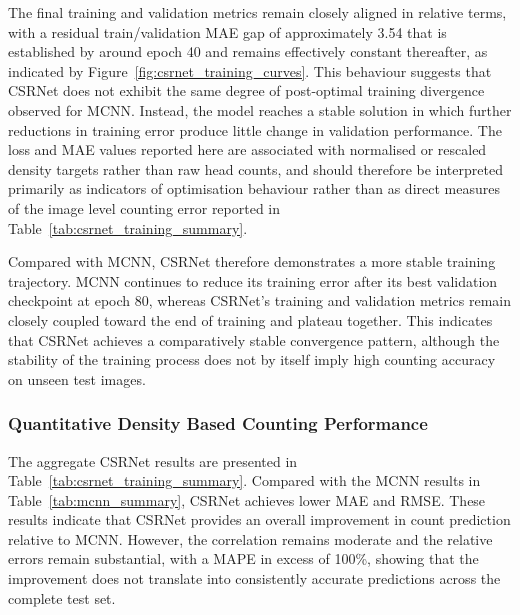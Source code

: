 \documentclass[12pt,a4paper]{report}
\begin{document}
The final training and validation metrics remain closely aligned in relative terms, with a residual train/validation MAE gap of approximately 3.54 that is established by around epoch 40 and remains effectively constant thereafter, as indicated by Figure~\ref{fig:csrnet_training_curves}. This behaviour suggests that CSRNet does not exhibit the same degree of post-optimal training divergence observed for MCNN. Instead, the model reaches a stable solution in which further reductions in training error produce little change in validation performance. The loss and MAE values reported here are associated with normalised or rescaled density targets rather than raw head counts, and should therefore be interpreted primarily as indicators of optimisation behaviour rather than as direct measures of the image level counting error reported in Table~\ref{tab:csrnet_training_summary}.

Compared with MCNN, CSRNet therefore demonstrates a more stable training trajectory. MCNN continues to reduce its training error after its best validation checkpoint at epoch 80, whereas CSRNet's training and validation metrics remain closely coupled toward the end of training and plateau together. This indicates that CSRNet achieves a comparatively stable convergence pattern, although the stability of the training process does not by itself imply high counting accuracy on unseen test images.

\subsubsection{Quantitative Density Based Counting Performance}

The aggregate CSRNet results are presented in Table~\ref{tab:csrnet_training_summary}. Compared with the MCNN results in Table~\ref{tab:mcnn_summary}, CSRNet achieves lower MAE and RMSE. These results indicate that CSRNet provides an overall improvement in count prediction relative to MCNN. However, the correlation remains moderate and the relative errors remain substantial, with a MAPE in excess of 100\%, showing that the improvement does not translate into consistently accurate predictions across the complete test set.
\end{document}
